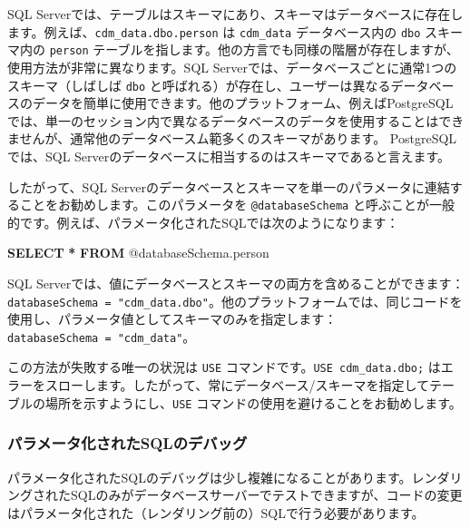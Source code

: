 \documentclass[
  11pt]{book}
\newenvironment{Shaded}{\begin{snugshade}}{\end{snugshade}}
\newcommand{\KeywordTok}[1]{\textcolor[rgb]{0.13,0.29,0.53}{\textbf{#1}}}
\newcommand{\NormalTok}[1]{#1}
\newcommand{\OperatorTok}[1]{\textcolor[rgb]{0.81,0.36,0.00}{\textbf{#1}}}
\theoremstyle{definition}
\theoremstyle{definition}
\theoremstyle{definition}
\theoremstyle{definition}
\theoremstyle{remark}
\begin{document}
SQL Serverでは、テーブルはスキーマにあり、スキーマはデータベースに存在します。例えば、\texttt{cdm\_data.dbo.person} は \texttt{cdm\_data} データベース内の \texttt{dbo} スキーマ内の \texttt{person} テーブルを指します。他の方言でも同様の階層が存在しますが、使用方法が非常に異なります。SQL Serverでは、データベースごとに通常1つのスキーマ（しばしば \texttt{dbo} と呼ばれる）が存在し、ユーザーは異なるデータベースのデータを簡単に使用できます。他のプラットフォーム、例えばPostgreSQLでは、単一のセッション内で異なるデータベースのデータを使用することはできませんが、通常他のデータベースム範多くのスキーマがあります。 PostgreSQLでは、SQL Serverのデータベースに相当するのはスキーマであると言えます。

したがって、SQL Serverのデータベースとスキーマを単一のパラメータに連結することをお勧めします。このパラメータを \texttt{@databaseSchema} と呼ぶことが一般的です。例えば、パラメータ化されたSQLでは次のようになります：

\begin{Shaded}
\begin{Highlighting}[]
\KeywordTok{SELECT} \OperatorTok{*} \KeywordTok{FROM}\NormalTok{ @databaseSchema.person}
\end{Highlighting}
\end{Shaded}

SQL Serverでは、値にデータベースとスキーマの両方を含めることができます：\texttt{databaseSchema\ =\ "cdm\_data.dbo"}。他のプラットフォームでは、同じコードを使用し、パラメータ値としてスキーマのみを指定します：\texttt{databaseSchema\ =\ "cdm\_data"}。

この方法が失敗する唯一の状況は \texttt{USE} コマンドです。\texttt{USE\ cdm\_data.dbo;} はエラーをスローします。したがって、常にデータベース/スキーマを指定してテーブルの場所を示すようにし、\texttt{USE} コマンドの使用を避けることをお勧めします。

\subsubsection*{パラメータ化されたSQLのデバッグ}\label{ux30d1ux30e9ux30e1ux30fcux30bfux5316ux3055ux308cux305fsqlux306eux30c7ux30d0ux30c3ux30b0}

パラメータ化されたSQLのデバッグは少し複雑になることがあります。レンダリングされたSQLのみがデータベースサーバーでテストできますが、コードの変更はパラメータ化された（レンダリング前の）SQLで行う必要があります。 
\end{document}
